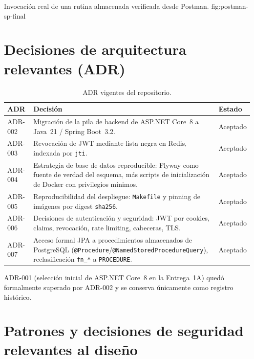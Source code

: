 %
{Invocaci\'on real de una rutina almacenada verificada desde Postman.}%
{fig:postman-sp-final}

\section{Decisiones de arquitectura relevantes (ADR)}
\label{sec:adr-relevantes-final}

\begin{table}[H]
  \centering
  \caption{ADR vigentes del repositorio.}
  \label{tab:adr-relevantes-final}
  \begin{tabular}{@{}p{2cm}p{9.5cm}p{2.5cm}@{}}
    \toprule
    ADR & Decisi\'on & Estado \\
    \midrule
    ADR-002 & Migraci\'on de la pila de backend de ASP.NET Core~8 a Java~21 / Spring Boot~3.2. & Aceptado \\
    ADR-003 & Revocaci\'on de JWT mediante lista negra en Redis, indexada por \texttt{jti}. & Aceptado \\
    ADR-004 & Estrategia de base de datos reproducible: Flyway como fuente de verdad del esquema, m\'as scripts de inicializaci\'on de Docker con privilegios m\'inimos. & Aceptado \\
    ADR-005 & Reproducibilidad del despliegue: \texttt{Makefile} y pinning de im\'agenes por digest \texttt{sha256}. & Aceptado \\
    ADR-006 & Decisiones de autenticaci\'on y seguridad: JWT por cookies, claims, revocaci\'on, rate limiting, cabeceras, TLS. & Aceptado \\
    ADR-007 & Acceso formal JPA a procedimientos almacenados de PostgreSQL (\texttt{@Procedure}/\texttt{@NamedStoredProcedureQuery}), reclasificaci\'on \texttt{fn\_*} a \texttt{PROCEDURE}. & Aceptado \\
    \bottomrule
  \end{tabular}
\end{table}

ADR-001 (selecci\'on inicial de ASP.NET Core~8 en la Entrega~1A) qued\'o
formalmente superado por ADR-002 y se conserva \'unicamente como registro
hist\'orico.

\section{Patrones y decisiones de seguridad relevantes al dise\~no}

